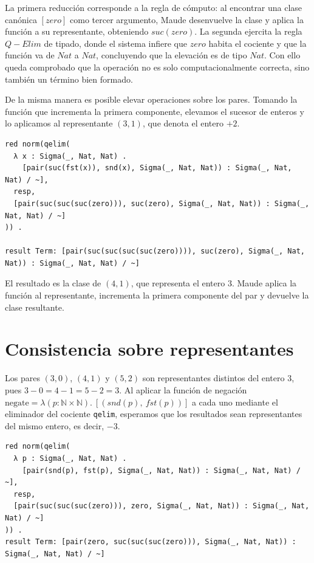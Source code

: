 La primera reducción corresponde a la regla de cómputo: al encontrar una clase canónica $[zero]$ como tercer argumento, Maude desenvuelve la clase y aplica la función a su representante, obteniendo $suc(zero)$. La segunda ejercita la regla $Q-Elim$ de tipado, donde el sistema infiere que $zero$ habita el cociente y que la función va de $Nat$ a $Nat$, concluyendo que la elevación es de tipo $Nat$. Con ello queda comprobado que la operación no es solo computacionalmente correcta, sino también un término bien formado.

De la misma manera es posible elevar operaciones sobre los pares. Tomando la función que incrementa la primera componente, elevamos el sucesor de enteros y lo aplicamos al representante $(3, 1)$, que denota el entero $+2$.

\begin{lstlisting}
red norm(qelim(
  λ x : Sigma(_, Nat, Nat) .
    [pair(suc(fst(x)), snd(x), Sigma(_, Nat, Nat)) : Sigma(_, Nat, Nat) / ~],
  resp,
  [pair(suc(suc(suc(zero))), suc(zero), Sigma(_, Nat, Nat)) : Sigma(_, Nat, Nat) / ~]
)) .

result Term: [pair(suc(suc(suc(suc(zero)))), suc(zero), Sigma(_, Nat, Nat)) : Sigma(_, Nat, Nat) / ~]
\end{lstlisting}

El resultado es la clase de $(4, 1)$, que representa el entero $3$. Maude aplica la función al representante, incrementa la primera componente del par y devuelve la clase resultante.

\section{Consistencia sobre representantes}

Los pares $(3, 0)$, $(4, 1)$ y $(5, 2)$ son representantes distintos del entero $3$,
pues $3 - 0 = 4 - 1 = 5 - 2 = 3$. Al aplicar la función de negación
$\text{negate} = \lambda(p : \mathbb{N} \times \mathbb{N}).\ [(snd(p),\ fst(p))]$
a cada uno mediante el eliminador del cociente \texttt{qelim}, esperamos que los resultados sean representantes del mismo entero, es decir, $-3$.

\begin{lstlisting}
red norm(qelim(
  λ p : Sigma(_, Nat, Nat) .
    [pair(snd(p), fst(p), Sigma(_, Nat, Nat)) : Sigma(_, Nat, Nat) / ~],
  resp,
  [pair(suc(suc(suc(zero))), zero, Sigma(_, Nat, Nat)) : Sigma(_, Nat, Nat) / ~]
)) .
result Term: [pair(zero, suc(suc(suc(zero))), Sigma(_, Nat, Nat)) : Sigma(_, Nat, Nat) / ~]
\end{lstlisting}


